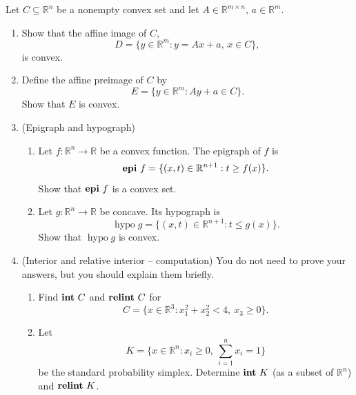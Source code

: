 \documentclass[11pt,letter,notitlepage]{article}
\DeclareMathOperator*{\relint}{\bf relint\,}
\DeclareMathOperator*{\intp}{\bf int\,}
\DeclareMathOperator*{\epi}{\bf epi\,}
\theoremstyle{definition}
\begin{document}
    \begin{exercise}
        Let \(C\subseteq\mathbb{R}^{n}\) be a nonempty convex set and let \(A\in\mathbb{R}^{m\times n}\), \(a\in\mathbb{R}^{m}\).
        \begin{enumerate}[label=(\arabic*)]
        \item Show that the affine image of \(C\),
        \[D=\{y\in\mathbb{R}^{m}:y=Ax+a,\,x\in C\},\]
        is convex.
        
        \item Define the affine preimage of \(C\) by
        \[E=\{y\in\mathbb{R}^{m}:Ay+a\in C\}.\]
        Show that \(E\) is convex.
        
        \item (Epigraph and hypograph)
        \begin{enumerate}[label=(\alph*)]
            \item Let \(f:\mathbb{R}^{n}\to\mathbb{R}\) be a convex function. The epigraph of \(f\) is 
            \[\epi f=\{(x,t)\in\mathbb{R}^{n+1}:t\geq f(x)\}.\]
            Show that \(\epi f\) is a convex set.
            \item Let \(g:\mathbb{R}^{n}\to\mathbb{R}\) be concave. Its hypograph is 
            \[\operatorname{hypo}g=\{(x,t)\in\mathbb{R}^{n+1}:t\leq g(x)\}.\]
            Show that \(\operatorname{hypo}g\) is convex.
        \end{enumerate}
        
        \item (Interior and relative interior -- computation) You do not need to prove your answers, but you should explain them briefly.
        \begin{enumerate}[label=(\alph*)]
            \item Find \(\intp C\) and \(\relint C\) for 
            \[C=\{x\in\mathbb{R}^{3}:x_{1}^{2}+x_{2}^{2}<4,\ x_{3}\geq 0\}.\]
            \item Let 
            \[K=\{x\in\mathbb{R}^{n}:x_{i}\geq 0,\ \sum_{i=1}^{n}x_{i}=1\}\]
            be the standard probability simplex. Determine \(\intp K\) (as a subset of \(\mathbb{R}^{n}\)) and \(\relint K\).
        \end{enumerate}
        \end{enumerate}
    \end{exercise}

\newpage
\end{document}
